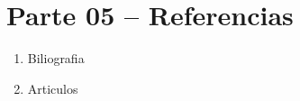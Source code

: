 \section{Parte 05 – Referencias} 

\begin{enumerate}[1.]
	\item Biliografia
	

	\item Articulos
	
	

\end{enumerate} 
